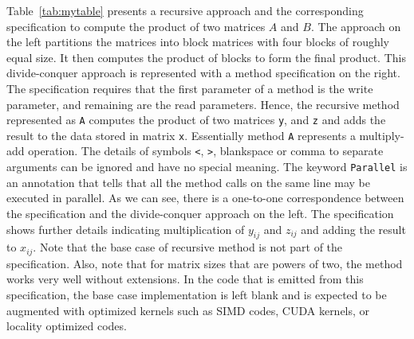 Table~\ref{tab:mytable} presents a recursive approach and the corresponding specification to compute the product of two matrices $A$ and $B$. The approach on the left partitions the matrices into block matrices with four blocks of roughly equal size. It then computes the product of blocks to form the final product. This divide-conquer approach is represented with a method specification on the right. The specification requires that the first parameter of a method is the write parameter, and remaining are the read parameters. Hence, the recursive method represented as \texttt{A}  computes the product of two matrices \texttt{y}, and \texttt{z} and adds the result to the data stored in matrix \texttt{x}.  Essentially method \texttt{A} represents a multiply-add operation. The details of symbols \texttt{<}, \texttt{>}, blankspace or comma to separate arguments can be ignored and have no special meaning. The keyword \texttt{Parallel} is an annotation that tells that all the method calls on the same line may be executed in parallel. As we can see, there is a one-to-one correspondence between the specification and the divide-conquer approach on the left. The specification 
 shows further details indicating multiplication of \texttt{$y_{ij}$} and \texttt{$z_{ij}$} and adding  the result to \texttt{$x_{ij}$}. 
 Note that the base case of recursive method is not part of the specification. Also, note that for matrix sizes that are powers of two, the method works very well without extensions. In the code that is emitted from this specification, the base case implementation is left blank and is expected to be augmented with optimized kernels such as SIMD codes, CUDA kernels, or locality optimized codes.  

